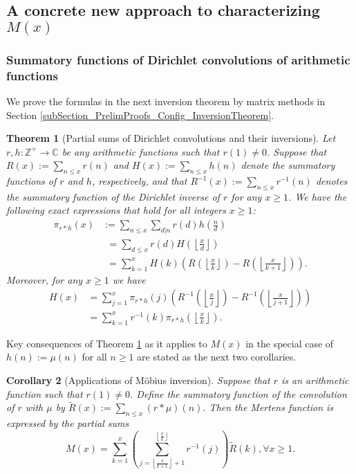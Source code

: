 \documentclass[11pt,reqno,a4letter]{article}
\numberwithin{figure}{section}
\numberwithin{table}{section}
\newcommand{\floor}[1]{\left\lfloor #1 \right\rfloor}
\newcommand{\Floor}[2]{\ensuremath{\left\lfloor \frac{#1}{#2} \right\rfloor}}
\theoremstyle{plain}
\newtheorem{theorem}{Theorem}
\newtheorem{cor}[theorem]{Corollary}
\numberwithin{theorem}{section}
\theoremstyle{definition}
\begin{document}
\subsection{A concrete new approach to characterizing $M(x)$} 

\subsubsection{Summatory functions of Dirichlet convolutions of arithmetic functions} 

We prove the formulas in the next inversion theorem by matrix methods in 
Section \ref{subSection_PrelimProofs_Config_InversionTheorem}. 

\begin{theorem}[Partial sums of Dirichlet convolutions and their inversions] 
\label{theorem_SummatoryFuncsOfDirCvls} 
Let $r,h: \mathbb{Z}^{+} \rightarrow \mathbb{C}$ be any arithmetic functions such that $r(1) \neq 0$. 
Suppose that $R(x) := \sum_{n \leq x} r(n)$ and $H(x) := \sum_{n \leq x} h(n)$ denote the summatory 
functions of $r$ and $h$, respectively, and that $R^{-1}(x) := \sum_{n \leq x} r^{-1}(n)$ 
denotes the summatory function of the 
Dirichlet inverse of $r$ for any $x \geq 1$. We have the following exact expressions that hold 
for all integers $x \geq 1$: 
\begin{align*} 
\pi_{r \ast h}(x) & := \sum_{n \leq x} \sum_{d|n} r(d) h\left(\frac{n}{d}\right) \\ 
     & \phantom{:}= \sum_{d \leq x} r(d) H\left(\Floor{x}{d}\right) \\ 
     & \phantom{:}= \sum_{k=1}^{x} H(k) \left(R\left(\Floor{x}{k}\right) - 
     R\left(\Floor{x}{k+1}\right)\right). 
\end{align*} 
Moreover, for any $x \geq 1$ we have 
\begin{align*} 
H(x) & = \sum_{j=1}^{x} \pi_{r \ast h}(j) \left(R^{-1}\left(\Floor{x}{j}\right) - 
     R^{-1}\left(\Floor{x}{j+1}\right)\right) \\ 
     & = \sum_{k=1}^{x} r^{-1}(k) \pi_{r \ast h}\left(\Floor{x}{k}\right). 
\end{align*} 
\end{theorem} 

Key consequences of Theorem \ref{theorem_SummatoryFuncsOfDirCvls} 
as it applies to $M(x)$ in the special case of $h(n) := \mu(n)$ for all $n \geq 1$ 
are stated as the next two corollaries. 

\begin{cor}[Applications of M\"obius inversion] 
\label{cor_CvlGAstMu} 
Suppose that $r$ is an arithmetic function such that 
$r(1) \neq 0$. Define the summatory function of 
the convolution of $r$ with $\mu$ by $\widetilde{R}(x) := \sum_{n \leq x} (r \ast \mu)(n)$. 
Then the Mertens function is expressed by the partial sums 
\[
M(x) = \sum_{k=1}^{x} \left(\sum_{j=\floor{\frac{x}{k+1}}+1}^{\floor{\frac{x}{k}}} r^{-1}(j)\right) 
     \widetilde{R}(k), \forall x \geq 1. 
\]
\end{cor} 
\end{document}
